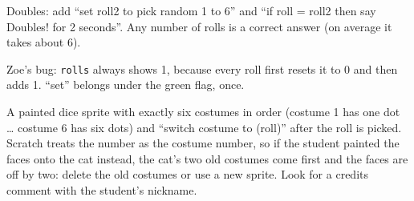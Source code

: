 \begin{answer}
Doubles: add \enquote{set roll2 to pick random 1 to 6} and \enquote{if roll = roll2 then say Doubles! for 2 seconds}. Any number of rolls is a correct answer (on average it takes about 6).

Zoe's bug: \texttt{rolls} always shows 1, because every roll first resets it to 0 and then adds 1. \enquote{set} belongs under the green flag, once.
\end{answer}

\begin{answer}
A painted dice sprite with exactly six costumes in order (costume 1 has one dot \ldots{} costume 6 has six dots) and \enquote{switch costume to (roll)} after the roll is picked. Scratch treats the number as the costume number, so if the student painted the faces onto the cat instead, the cat's two old costumes come first and the faces are off by two: delete the old costumes or use a new sprite. Look for a credits comment with the student's nickname.
\end{answer}
